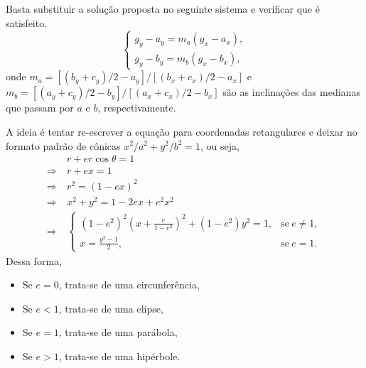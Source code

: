 
\begin{questions}

\setcounter{question}{3}

\begin{solution}
Basta substituir a solução proposta no seguinte sistema e verificar que é satisfeito.
    \[\begin{cases}
        g_y - a_y = m_a (g_x-a_x),\\
        g_y - b_y = m_b (g_x-b_x),
    \end{cases}\]
    onde $m_a = [(b_y+c_y)/2-a_y]/[(b_x+c_x)/2-a_x]$ e $m_b = [(a_y+c_y)/2-b_y]/[(a_x+c_x)/2-b_x]$ são as inclinações das medianas que passam por $a$ e $b$, respectivamente.
\end{solution}

\setcounter{question}{9}

\begin{solution}
    A ideia é tentar re-escrever a equação para coordenadas retangulares e deixar no formato padrão de cônicas $x^2/a^2 + y^2/b^2 = 1$, ou seja,
    \begin{align*}
                    & r+e r \cos \theta = 1 \\
        \Rightarrow~ & r + ex = 1 \\   
        \Rightarrow~ & r^2 = (1 - ex)^2 \\
        \Rightarrow~ & x^2+y^2 = 1 - 2ex + e^2 x^2 \\
        \Rightarrow~ & 
            \begin{cases}
                (1-e^2)^2 \left( x + \frac{e}{1-e^2} \right)^2 + (1-e^2) y^2 = 1, & \text{se}\ e\neq1, \\
                x = \frac{y^2-1}{2}, & \text{se}\ e = 1.
            \end{cases}
    \end{align*}
    Dessa forma,
    \begin{itemize}
        \item Se $e=0$, trata-se de uma circunferência,
        \item Se $e<1$, trata-se de uma elipse,
        \item Se $e=1$, trata-se de uma parábola,
        \item Se $e>1$, trata-se de uma hipérbole.
    \end{itemize}
\end{solution}

\end{questions}
